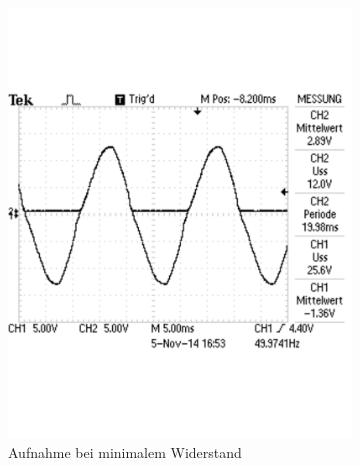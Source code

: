 \documentclass[12pt,a4paper]{article}
\begin{document}
\begin{figure}[H]
        \centering
        \begin{subfigure}[b]{0.48\textwidth}
                \includegraphics[width=\textwidth , scale = 0.4]{2_3_1.pdf}
                \caption[Aufnahme bei minimalem Widerstand]{Aufnahme bei minimalem Widerstand}
 				 \label{fig:2_3_1}
        \end{subfigure}%
        \hfill
        \begin{subfigure}[b]{0.48\textwidth}

\end{subfigure}
\end{figure}
\end{document}
